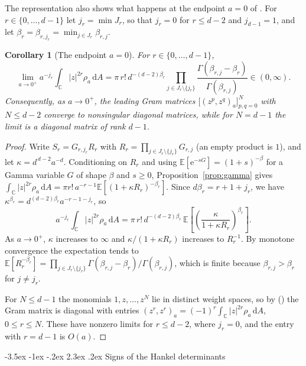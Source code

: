 \documentclass[twoside,10pt]{article}
\makeatletter
\numberwithin{equation}{section}
\theoremstyle{slbody}
\newtheorem{corollary}[theorem]{Corollary}
\theoremstyle{remark}
\newcommand{\C}{\mathbb C}
\newcommand{\dd}{\,\mathrm d}
\newcommand{\e}{\mathrm e}
\newcommand{\E}{\mathbb E}
\renewcommand{\section}{%
  \@startsection{section}{1}{\z@}%
    {-3.5ex \@plus -1ex \@minus -.2ex}%
    {2.3ex \@plus .2ex}%
    {\normalfont\large\bfseries}}
\renewcommand{\eqref}[1]{%
  \textup{{\normalfont(\oldstylenums{\ref{#1}}}\normalfont)}}
\makeatother
\begin{document}
The representation also shows what happens at the endpoint \(a=0\) of
\cite[Conjecture~3.6]{FelderHoppe2025}.  For \(r\in\{0,\ldots,d-1\}\) let
\(j_r=\min J_r\), so that \(j_r=0\) for \(r\leq d-2\) and
\(j_{d-1}=1\), and let \(\beta_r=\beta_{r,j_r}=\min_{j\in J_r}\beta_{r,j}\).

\begin{corollary}[The endpoint \(a=0\)]\label{cor:endpoint}
For \(r\in\{0,\ldots,d-1\}\),
\[
\lim_{a\to0^+}a^{-j_r}\int_\C|z|^{2r}\rho_a\dd A
=\pi\,r!\,d^{-(d-2)\beta_r}\prod_{j\in J_r\setminus\{j_r\}}
\frac{\Gamma(\beta_{r,j}-\beta_r)}{\Gamma(\beta_{r,j})}
\in(0,\infty).
\]
Consequently, as \(a\to0^+\), the leading Gram matrices
\(\bigl[(z^p,z^q)_a\bigr]_{p,q=0}^N\) with \(N\leq d-2\) converge to
nonsingular diagonal matrices, while for \(N=d-1\) the limit is a
diagonal matrix of rank \(d-1\).
\end{corollary}

\begin{proof}
Write \(S_r=G_{r,j_r}R_r\) with \(R_r=\prod_{j\in J_r\setminus\{j_r\}}
G_{r,j}\) (an empty product is \(1\)), and let
\(\kappa=d^{\,d-2}a^{-d}\).  Conditioning on \(R_r\) and using
\(\E[\e^{-sG}]=(1+s)^{-\beta}\) for a Gamma variable \(G\) of shape
\(\beta\) and \(s\geq0\), Proposition~\ref{prop:gamma} gives
\(\int_\C|z|^{2r}\rho_a\dd A=\pi r!\,a^{-r-1}
\E[(1+\kappa R_r)^{-\beta_r}]\).  Since \(d\beta_r=r+1+j_r\), we have
\(\kappa^{\beta_r}=d^{(d-2)\beta_r}a^{-r-1-j_r}\), so
\[
a^{-j_r}\int_\C|z|^{2r}\rho_a\dd A
=\pi\,r!\,d^{-(d-2)\beta_r}\,
\E\left[\left(\frac{\kappa}{1+\kappa R_r}\right)^{\beta_r}\right].
\]
As \(a\to0^+\), \(\kappa\) increases to \(\infty\) and
\(\kappa/(1+\kappa R_r)\) increases to \(R_r^{-1}\).  By monotone
convergence the expectation tends to
\(\E[R_r^{-\beta_r}]=\prod_{j\in J_r\setminus\{j_r\}}
\Gamma(\beta_{r,j}-\beta_r)/\Gamma(\beta_{r,j})\), which is finite
because \(\beta_{r,j}>\beta_r\) for \(j\neq j_r\).

For \(N\leq d-1\) the monomials \(1,z,\ldots,z^N\) lie in distinct
weight spaces, so by \eqref{eq:gram-block} the Gram matrix is diagonal
with entries \((z^r,z^r)_a=(-1)^r\int_\C|z|^{2r}\rho_a\dd A\),
\(0\leq r\leq N\).  These have nonzero limits for \(r\leq d-2\), where
\(j_r=0\), and the entry with \(r=d-1\) is \(O(a)\).
\end{proof}

\section{Signs of the Hankel determinants}\label{sec:signs}
\end{document}
